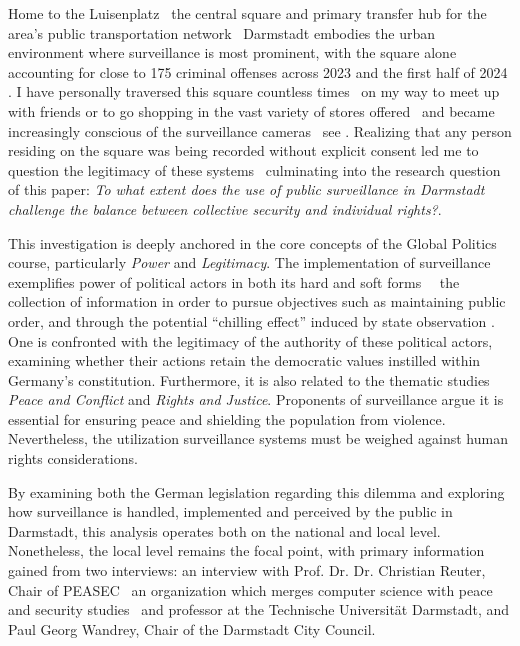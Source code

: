 \documentclass[12pt]{article}
\begin{document}
	Home to the Luisenplatz \textemdash\ the central square and primary transfer hub for the area's public transportation network \textemdash\ Darmstadt embodies the urban environment where surveillance is most prominent, with the square alone accounting for close to 175 criminal offenses across 2023 and the first half of 2024 \parencite{schonbein_weapon_2025}. I have personally traversed this square countless times \textemdash\ on my way to meet up with friends or to go shopping in the vast variety of stores offered \textemdash\ and became increasingly conscious of the surveillance cameras \textemdash\ see . Realizing that any person residing on the square was being recorded without explicit consent led me to question the legitimacy of these systems \textemdash\ culminating into the research question of this paper: \textit{To what extent does the use of public surveillance in Darmstadt challenge the balance between collective security and individual rights?}.
	
	This investigation is deeply anchored in the core concepts of the Global Politics course, particularly \textit{Power} and \textit{Legitimacy}. The implementation of surveillance exemplifies power of political actors in both its hard and soft forms \parencite{courseCompanion2024}\ \textemdash\ the collection of information in order to pursue objectives such as maintaining public order, and through the potential ``chilling effect'' induced by state observation \parencite{murray2024}. One is confronted with the legitimacy of the authority of these political actors, examining whether their actions retain the democratic values instilled within Germany's constitution. Furthermore, it is also related to the thematic studies \textit{Peace and Conflict} and \textit{Rights and Justice}. Proponents of surveillance argue it is essential for ensuring peace and shielding the population from violence. Nevertheless, the utilization surveillance systems must be weighed against human rights considerations.
	
	By examining both the German legislation regarding this dilemma and exploring how surveillance is handled, implemented and perceived by the public in Darmstadt, this analysis operates both on the national and local level. Nonetheless, the local level remains the focal point, with primary information gained from two interviews: an interview with Prof. Dr. Dr. Christian Reuter, Chair of PEASEC \textemdash\ an organization which merges computer science with peace and security studies \parencite{noauthor_peasec_2025} \textemdash\ and professor at the Technische Universität Darmstadt, and Paul Georg Wandrey, Chair of the Darmstadt City Council.
	
\end{document}
